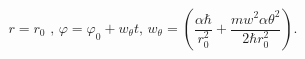 \begin{equation}
r=r_{0}\text{ \ \ \ \ , \ \ \ \ \ }\varphi=\varphi_{0}+w_{\theta}t\text{,
\ \ \ }w_{\theta}=\left(  \frac{\alpha\hbar}{r_{0}^{2}}+\frac{mw^{2}%
\alpha\theta^{2}}{2\hbar r_{0}^{2}}\right)  .\label{41}%
\end{equation}

